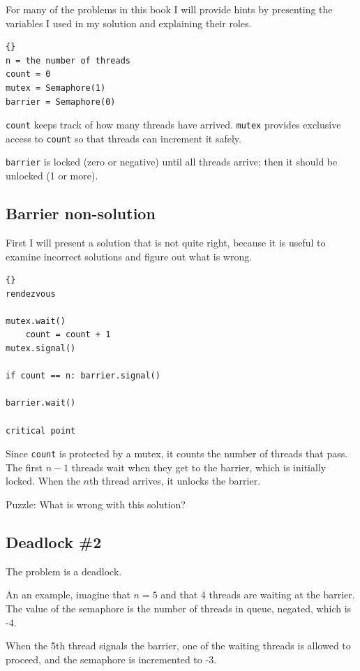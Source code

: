 \documentclass{book}
\newcommand{\clearemptydoublepage}{\newpage\cleardoublepage}
\begin{document}
For many of the problems in this book I will provide hints
by presenting the variables I used in my solution and
explaining their roles.

\begin{lstlisting}[title={Barrier hint}]{}
n = the number of threads
count = 0
mutex = Semaphore(1)
barrier = Semaphore(0)
\end{lstlisting}

{\tt count} keeps track of how many threads have arrived.
{\tt mutex} provides exclusive access to {\tt count} so that
threads can increment it safely.

{\tt barrier} is locked
(zero or negative) until all threads arrive; then it should
be unlocked (1 or more).


\clearemptydoublepage
\subsection {Barrier non-solution}

First I will present a solution that is not quite right, because
it is useful to examine incorrect solutions and figure out what
is wrong.

\begin{lstlisting}[title={Barrier non-solution}]{}
rendezvous

mutex.wait()
    count = count + 1
mutex.signal()

if count == n: barrier.signal()

barrier.wait()

critical point
\end{lstlisting}

Since {\tt count} is protected by a mutex, it counts the number of
threads that pass.  The first $n-1$ threads wait when they get to the
barrier, which is initially locked.  When the $n$th thread arrives, it
unlocks the barrier.

Puzzle:  What is wrong with this solution?


\clearemptydoublepage
\subsection{Deadlock \#2}

The problem is a deadlock.

An an example, imagine that $n=5$
and that 4 threads are waiting at the barrier.  The value
of the semaphore is the number of threads in queue, negated, 
which is -4.

When the 5th thread signals the barrier, one of the waiting
threads is allowed to proceed, and the semaphore is incremented
to -3.
\end{document}
